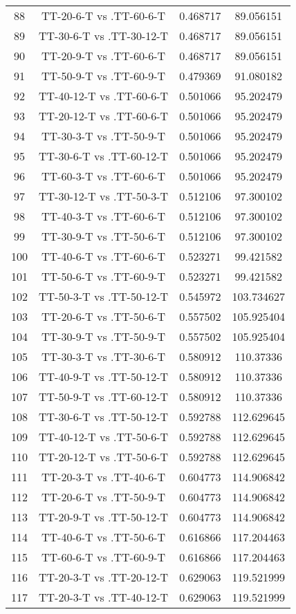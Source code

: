 \documentclass[a4paper,10pt]{article}
\begin{document}
\begin{landscape}
\begin{table}[!htp]
\begin{tabular}{cccc}
88&TT-20-6-T vs .TT-60-6-T&0.468717&89.056151\\
89&TT-30-6-T vs .TT-30-12-T&0.468717&89.056151\\
90&TT-20-9-T vs .TT-60-6-T&0.468717&89.056151\\
91&TT-50-9-T vs .TT-60-9-T&0.479369&91.080182\\
92&TT-40-12-T vs .TT-60-6-T&0.501066&95.202479\\
93&TT-20-12-T vs .TT-60-6-T&0.501066&95.202479\\
94&TT-30-3-T vs .TT-50-9-T&0.501066&95.202479\\
95&TT-30-6-T vs .TT-60-12-T&0.501066&95.202479\\
96&TT-60-3-T vs .TT-60-6-T&0.501066&95.202479\\
97&TT-30-12-T vs .TT-50-3-T&0.512106&97.300102\\
98&TT-40-3-T vs .TT-60-6-T&0.512106&97.300102\\
99&TT-30-9-T vs .TT-50-6-T&0.512106&97.300102\\
100&TT-40-6-T vs .TT-60-6-T&0.523271&99.421582\\
101&TT-50-6-T vs .TT-60-9-T&0.523271&99.421582\\
102&TT-50-3-T vs .TT-50-12-T&0.545972&103.734627\\
103&TT-20-6-T vs .TT-50-6-T&0.557502&105.925404\\
104&TT-30-9-T vs .TT-50-9-T&0.557502&105.925404\\
105&TT-30-3-T vs .TT-30-6-T&0.580912&110.37336\\
106&TT-40-9-T vs .TT-50-12-T&0.580912&110.37336\\
107&TT-50-9-T vs .TT-60-12-T&0.580912&110.37336\\
108&TT-30-6-T vs .TT-50-12-T&0.592788&112.629645\\
109&TT-40-12-T vs .TT-50-6-T&0.592788&112.629645\\
110&TT-20-12-T vs .TT-50-6-T&0.592788&112.629645\\
111&TT-20-3-T vs .TT-40-6-T&0.604773&114.906842\\
112&TT-20-6-T vs .TT-50-9-T&0.604773&114.906842\\
113&TT-20-9-T vs .TT-50-12-T&0.604773&114.906842\\
114&TT-40-6-T vs .TT-50-6-T&0.616866&117.204463\\
115&TT-60-6-T vs .TT-60-9-T&0.616866&117.204463\\
116&TT-20-3-T vs .TT-20-12-T&0.629063&119.521999\\
117&TT-20-3-T vs .TT-40-12-T&0.629063&119.521999\\

\end{tabular}
\end{table}
\end{landscape}
\end{document}
